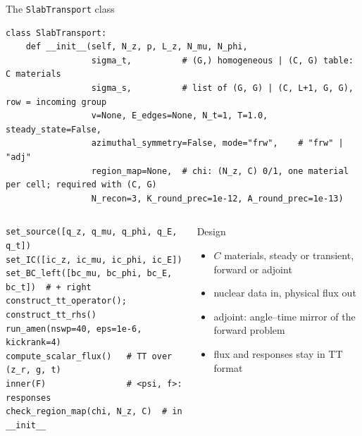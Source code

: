 \documentclass[aspectratio=169,11pt]{beamer}
\begin{document}
\begin{frame}[fragile]{The \texttt{SlabTransport} class}
\begin{lstlisting}[basicstyle=\ttfamily\scriptsize]
class SlabTransport:
    def __init__(self, N_z, p, L_z, N_mu, N_phi,
                 sigma_t,          # (G,) homogeneous | (C, G) table: C materials
                 sigma_s,          # list of (G, G) | (C, L+1, G, G), row = incoming group
                 v=None, E_edges=None, N_t=1, T=1.0, steady_state=False,
                 azimuthal_symmetry=False, mode="frw",    # "frw" | "adj"
                 region_map=None,  # chi: (N_z, C) 0/1, one material per cell; required with (C, G)
                 N_recon=3, K_round_prec=1e-12, A_round_prec=1e-13)
\end{lstlisting}
\vspace{1ex}
\begin{columns}[T,onlytextwidth]
\begin{lstlisting}[basicstyle=\ttfamily\scriptsize]
set_source([q_z, q_mu, q_phi, q_E, q_t])
set_IC([ic_z, ic_mu, ic_phi, ic_E])
set_BC_left([bc_mu, bc_phi, bc_E, bc_t])  # + right
construct_tt_operator(); construct_tt_rhs()
run_amen(nswp=40, eps=1e-6, kickrank=4)
compute_scalar_flux()   # TT over (z_r, g, t)
inner(F)                # <psi, f>: responses
check_region_map(chi, N_z, C)  # in __init__
\end{lstlisting}
\footnotesize
\begin{block}{Design}
\scriptsize
\begin{itemize}\setlength\itemsep{1pt}
\item $C$ materials, steady or transient, forward or adjoint
\item nuclear data in, physical flux out
\item adjoint: angle--time mirror of the forward problem
\item flux and responses stay in TT format
\end{itemize}
\end{block}
\end{columns}
\end{frame}
\end{document}

